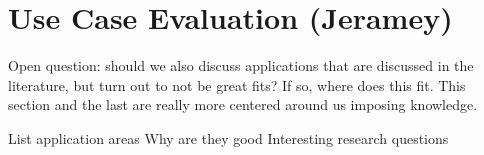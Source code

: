 \section{Use Case Evaluation (Jeramey)}

Open question: should we also discuss applications that are discussed in the literature, but turn out to not be great fits? If so, where does this fit. This section and the last are really more centered around us imposing knowledge.

List application areas
	Why are they good
	Interesting research questions
